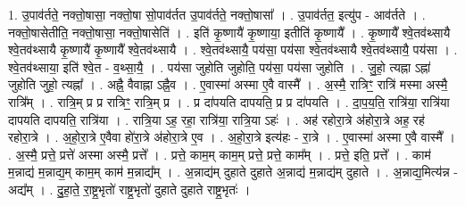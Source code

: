 \documentclass[17pt]{extarticle}
\begin{document}
1. उ॒पाव॑र्तते॒ नक्तो॒षासा॒ नक्तो॒षा सो॒पाव॑र्तत उ॒पाव॑र्तते॒ नक्तो॒षासा᳚ । . उ॒पाव॑र्तत॒ इत्यु॑प - आव॑र्तते । . नक्तो॒षासेतीति॒ नक्तो॒षासा॒ नक्तो॒षासेति॑ । . इति॑ कृ॒ष्णायै॑ कृ॒ष्णाया॒ इतीति॑ कृ॒ष्णायै᳚ । . कृ॒ष्णायै᳚ श्वे॒तव॑थ्सायै श्वे॒तव॑थ्सायै कृ॒ष्णायै॑ कृ॒ष्णायै᳚ श्वे॒तव॑थ्सायै । . श्वे॒तव॑थ्सायै॒ पय॑सा॒ पय॑सा श्वे॒तव॑थ्सायै श्वे॒तव॑थ्सायै॒ पय॑सा । . श्वे॒तव॑थ्साया॒ इति॑ श्वे॒त - व॒थ्सा॒यै॒ । . पय॑सा जुहोति जुहोति॒ पय॑सा॒ पय॑सा जुहोति । . जु॒हो॒ त्यह्ना ऽह्ना॑ जुहोति जुहो॒ त्यह्ना᳚ । . अह्नै॒ वैवाह्ना ऽह्नै॒व । . ए॒वास्मा॑ अस्मा ए॒वै वास्मै᳚ । . अ॒स्मै॒ रात्रिꣳ॒॒ रात्रि॑ मस्मा अस्मै॒ रात्रि᳚म् । . रात्रि॒म् प्र प्र रात्रिꣳ॒॒ रात्रि॒म् प्र । . प्र दा॑पयति दापयति॒ प्र प्र दा॑पयति । . दा॒प॒य॒ति॒ रात्रि॑या॒ रात्रि॑या दापयति दापयति॒ रात्रि॑या । . रात्रि॒या ऽह॒ रहा॒ रात्रि॑या॒ रात्रि॒या ऽहः॑ । . अह॑ रहोरा॒त्रे अ॑होरा॒त्रे अह॒ रह॑ रहोरा॒त्रे । . अ॒हो॒रा॒त्रे ए॒वैवा हो॑रा॒त्रे अ॑होरा॒त्रे ए॒व । . अ॒हो॒रा॒त्रे इत्य॑हः - रा॒त्रे । . ए॒वास्मा॑ अस्मा ए॒वै वास्मै᳚ । . अ॒स्मै॒ प्रत्ते॒ प्रत्ते॑ अस्मा अस्मै॒ प्रत्ते᳚ । . प्रत्ते॒ काम॒म् काम॒म् प्रत्ते॒ प्रत्ते॒ काम᳚म् । . प्रत्ते॒ इति॒ प्रत्ते᳚ । . काम॑ म॒न्नाद्य॑ म॒न्नाद्य॒म् काम॒म् काम॑ म॒न्नाद्य᳚म् । . अ॒न्नाद्य॑म् दुहाते दुहाते अ॒न्नाद्य॑ म॒न्नाद्य॑म् दुहाते । . अ॒न्नाद्य॒मित्य॑न्न - अद्य᳚म् । . दु॒हा॒ते॒ रा॒ष्ट्र॒भृतो॑ राष्ट्र॒भृतो॑ दुहाते दुहाते राष्ट्र॒भृतः॑ । \newline
\end{document}
